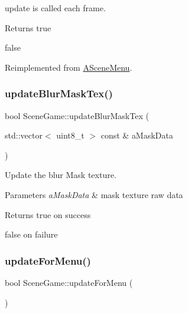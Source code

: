 update is called each frame. 

\begin{DoxyReturn}{Returns}
true 

false 
\end{DoxyReturn}


Reimplemented from \hyperlink{class_a_scene_menu_a1deeb5fd9be97376998cd2af36f29744}{A\+Scene\+Menu}.

\mbox{\label{class_scene_game_a8479e23eab1b5b0a5501bcf029846639}} 
\subsubsection{\texorpdfstring{update\+Blur\+Mask\+Tex()}{updateBlurMaskTex()}}
{\footnotesize\ttfamily bool Scene\+Game\+::update\+Blur\+Mask\+Tex (\begin{DoxyParamCaption}\item[{std\+::vector$<$ uint8\+\_\+t $>$ const \&}]{a\+Mask\+Data }\end{DoxyParamCaption})}



Update the blur Mask texture. 


\begin{DoxyParams}{Parameters}
{\em a\+Mask\+Data} & mask texture raw data \\
\hline
\end{DoxyParams}
\begin{DoxyReturn}{Returns}
true on success 

false on failure 
\end{DoxyReturn}
\mbox{\label{class_scene_game_a31f15b71525e919299f3d410e01a6b51}} 
\subsubsection{\texorpdfstring{update\+For\+Menu()}{updateForMenu()}}
{\footnotesize\ttfamily bool Scene\+Game\+::update\+For\+Menu (\begin{DoxyParamCaption}{ }\end{DoxyParamCaption})}



